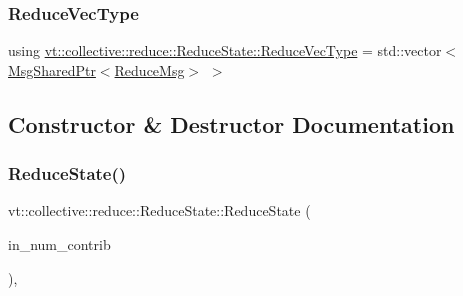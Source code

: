 \mbox{\label{structvt_1_1collective_1_1reduce_1_1_reduce_state_afea0a5b0e2cdfd86417394d044e440db}} 
\subsubsection{\texorpdfstring{Reduce\+Vec\+Type}{ReduceVecType}}
{\footnotesize\ttfamily using \hyperlink{structvt_1_1collective_1_1reduce_1_1_reduce_state_afea0a5b0e2cdfd86417394d044e440db}{vt\+::collective\+::reduce\+::\+Reduce\+State\+::\+Reduce\+Vec\+Type} =  std\+::vector$<$\hyperlink{namespacevt_ab2b3d506ec8e8d1540aede826d84a239}{Msg\+Shared\+Ptr}$<$\hyperlink{structvt_1_1collective_1_1reduce_1_1_reduce_msg}{Reduce\+Msg}$>$ $>$}



\subsection{Constructor \& Destructor Documentation}
\mbox{\label{structvt_1_1collective_1_1reduce_1_1_reduce_state_abc38bf2a33153df0f405b5a812cbd2e9}} 
\subsubsection{\texorpdfstring{Reduce\+State()}{ReduceState()}}
{\footnotesize\ttfamily vt\+::collective\+::reduce\+::\+Reduce\+State\+::\+Reduce\+State (\begin{DoxyParamCaption}\item[{\hyperlink{structvt_1_1collective_1_1reduce_1_1_reduce_state_ae83d217c90b8a8895ca998d7ea9c49e4}{Reduce\+Num\+Type}}]{in\+\_\+num\+\_\+contrib }\end{DoxyParamCaption})\hspace{0.3cm}{\ttfamily [inline]}, {\ttfamily [explicit]}}



